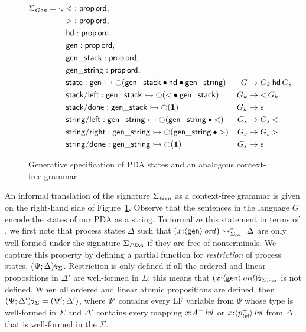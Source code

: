 \begin{figure}
\begin{align*}
 \Sigma_{\it Gen} = \cdot, 
~&{\sf <} : {\sf prop}\,{\sf ord},\\
~&{\sf >} : {\sf prop}\,{\sf ord},\\
~&{\sf hd} : {\sf prop}\,{\sf ord},\\
~&{\sf gen} : {\sf prop}\,{\sf ord},\\
~&{\sf gen\_stack} : {\sf prop}\,{\sf ord},\\
~&{\sf gen\_string} : {\sf prop}\,{\sf ord},\\
~&{\sf state} : {\sf gen} 
       \rightarrowtail {\ocircle}({\sf gen\_stack} \mathbin{\bullet} {\sf hd} 
                         \mathbin{\bullet} {\sf gen\_string})
& G & \rightarrow G_k\,{\sf hd}\,G_s\\
~&{\sf stack/left} : {\sf gen\_stack} 
       \rightarrowtail {\ocircle}({\sf <} \mathbin{\bullet} {\sf gen\_stack})
& G_k & \rightarrow {\sf <}\,G_k \\
~&{\sf stack/done} : {\sf gen\_stack} \rightarrowtail {\ocircle}(\mathbf{1})
& G_k & \rightarrow \epsilon\\
~&{\sf string/left} : 
     {\sf gen\_string} 
       \rightarrowtail {\ocircle}({\sf gen\_string} \mathbin{\bullet} {\sf <})
& G_s & \rightarrow G_s\,{\sf <}\\
~&{\sf string/right} : 
     {\sf gen\_string} 
       \rightarrowtail {\ocircle}({\sf gen\_string} \mathbin{\bullet} {\sf >})
& G_s & \rightarrow G_s\,{\sf >}\\
~&{\sf string/done} : 
     {\sf gen\_string} 
       \rightarrowtail {\ocircle}(\mathbf{1})
& G_s & \rightarrow \epsilon
\end{align*}
\caption{Generative specification of PDA states and an analogous
  context-free grammar}
\label{fig:pda-gen}
\end{figure}

An informal translation of the signature $\Sigma_{\it Gen}$ as a
context-free grammar is given on the right-hand side of
Figure~\ref{fig:pda-gen}. Observe that the sentences in the language
$G$ encode the states of our PDA as a string. To formalize this
statement in terms of \sls, we first note that process states $\Delta$
such that $(x{:}{\langle {\sf gen} \rangle}\,{{\it ord}}) \leadsto^*_{\Sigma_{\it Gen}}
\Delta$ are only well-formed under the signature $\Sigma_{\it PDA}$ if
they are free of nonterminals. We capture this property by defining a
partial function for {\it restriction} of process states,
${(\Psi; \Delta)}{\mbox{\lightning}}_{\Sigma}$. Restriction is only defined if
all the ordered and linear propositions in $\Delta'$ are well-formed
in $\Sigma$; this means that ${(x{:}{\langle {\sf
      gen} \rangle}\,{{\it ord}})}{\mbox{\lightning}}_{\Sigma_{\it PDA}}$ is not defined. When all ordered and
linear atomic propositions are defined, then ${(\Psi;
  \Delta')}{\mbox{\lightning}}_{\Sigma} = (\Psi'; \Delta')$, where $\Psi'$ contains every
LF variable from $\Psi$ whose type is well-formed in $\Sigma$ and
$\Delta'$ contains every mapping $x{:}{A^-}\,{{\it lvl}}$ or
$x{:}{\langle {p^+_{\it lvl}} \rangle}\,{{\it lvl}}$ from $\Delta$ that is well-formed in
the $\Sigma$.

